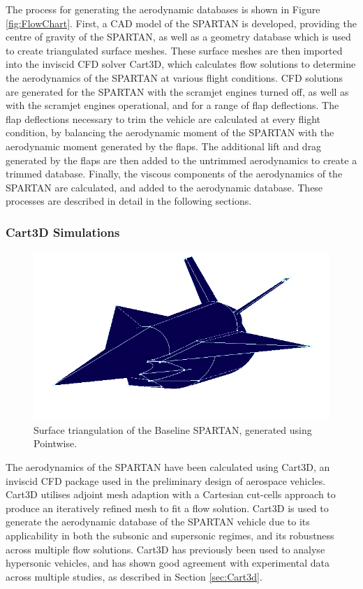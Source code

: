 The process for generating the aerodynamic databases is shown in Figure \ref{fig:FlowChart}. First, a CAD model of the SPARTAN is developed, providing the centre of gravity of the SPARTAN, as well as a geometry database which is used to create triangulated surface meshes. These surface meshes are then imported into the inviscid CFD solver Cart3D\cite{CART3D}, which calculates flow solutions to determine the aerodynamics of the SPARTAN at various flight conditions. CFD solutions are generated for the SPARTAN with the scramjet engines turned off, as well as with the scramjet engines operational, and for a range of flap deflections. 
The flap deflections necessary to trim the vehicle are calculated at every flight condition, by balancing the aerodynamic moment of the SPARTAN with the aerodynamic moment generated by the flaps. 
The additional lift and drag generated by the flaps are then added to the untrimmed aerodynamics to create a trimmed database.
Finally, the viscous components of the aerodynamics of the SPARTAN are calculated, and added to the aerodynamic database. These processes are described in detail in the following sections. 







\subsubsection{Cart3D Simulations}\label{sec:cart3d}
\begin{figure}[ht]
	\centering
	\includegraphics[width=0.6\linewidth]{figures/3_vehicle_design/Pointwise}
	\caption{Surface triangulation of the Baseline SPARTAN, generated using Pointwise\cite{Pointwise}.}
	\label{fig:Pointwise}
\end{figure}

The aerodynamics of the SPARTAN have been calculated using Cart3D, an inviscid CFD package used in the preliminary design of aerospace vehicles. Cart3D utilises adjoint mesh adaption with a Cartesian cut-cells approach to produce an iteratively refined mesh to fit a flow solution. Cart3D is used to generate the aerodynamic database of the SPARTAN vehicle due to its applicability in both the subsonic
and supersonic regimes, and its robustness across multiple flow solutions\cite{Sagerman2017,Abeynayake,Aftosmis2011,Almosnino2016a,Gomez2004}. Cart3D has previously been used to
analyse hypersonic vehicles, and has shown good agreement with experimental data across multiple studies\cite{Sagerman2017,Abeynayake,Aftosmis2011,Almosnino2016a}, as described in Section \ref{sec:Cart3d}.


